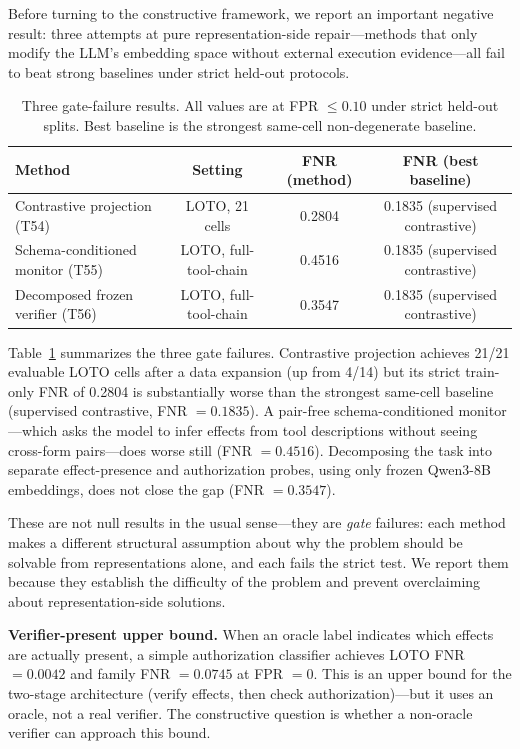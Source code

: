 \documentclass{article}
\begin{document}
Before turning to the constructive framework, we report an important negative result: three attempts at pure representation-side repair---methods that only modify the LLM's embedding space without external execution evidence---all fail to beat strong baselines under strict held-out protocols.

\begin{table}[t]
\centering
\caption{Three gate-failure results. All values are at FPR $\leq 0.10$ under strict held-out splits. Best baseline is the strongest same-cell non-degenerate baseline.}
\label{tab:gatefail}
\begin{tabular}{lccc}
\toprule
Method & Setting & FNR (method) & FNR (best baseline) \\
\midrule
Contrastive projection (T54) & LOTO, 21 cells & 0.2804 & 0.1835 (supervised contrastive) \\
Schema-conditioned monitor (T55) & LOTO, full-tool-chain & 0.4516 & 0.1835 (supervised contrastive) \\
Decomposed frozen verifier (T56) & LOTO, full-tool-chain & 0.3547 & 0.1835 (supervised contrastive) \\
\bottomrule
\end{tabular}
\end{table}

Table~\ref{tab:gatefail} summarizes the three gate failures. Contrastive projection achieves 21/21 evaluable LOTO cells after a data expansion (up from 4/14) but its strict train-only FNR of 0.2804 is substantially worse than the strongest same-cell baseline (supervised contrastive, FNR $=0.1835$). A pair-free schema-conditioned monitor---which asks the model to infer effects from tool descriptions without seeing cross-form pairs---does worse still (FNR $=0.4516$). Decomposing the task into separate effect-presence and authorization probes, using only frozen Qwen3-8B embeddings, does not close the gap (FNR $=0.3547$).

These are not null results in the usual sense---they are \emph{gate} failures: each method makes a different structural assumption about why the problem should be solvable from representations alone, and each fails the strict test. We report them because they establish the difficulty of the problem and prevent overclaiming about representation-side solutions.

\textbf{Verifier-present upper bound.} When an oracle label indicates which effects are actually present, a simple authorization classifier achieves LOTO FNR $=0.0042$ and family FNR $=0.0745$ at FPR $=0$. This is an upper bound for the two-stage architecture (verify effects, then check authorization)---but it uses an oracle, not a real verifier. The constructive question is whether a non-oracle verifier can approach this bound.
\end{document}
